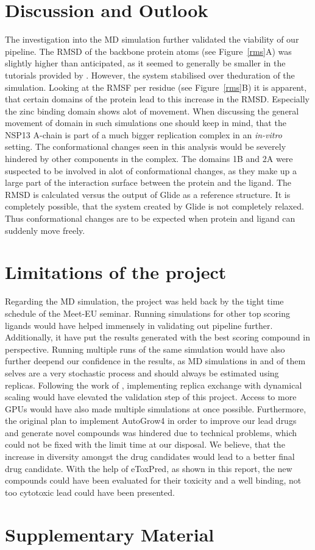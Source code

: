 \documentclass[11pt, letterpaper, titlepage]{article}
\renewcommand{\cite}{\parencite}
\begin{document}
\FloatBarrier

\section{Discussion and Outlook}
The investigation into the \acf{MD} simulation further validated the viability of our pipeline. The RMSD of the backbone protein atoms (see Figure~\ref{rms}A) was slightly higher than anticipated, as it seemed to generally be smaller in the tutorials provided by \citeauthor{Lemkul2018}. However, the system stabilised over theduration of the simulation. Looking at the RMSF per residue (see Figure~\ref{rms}B) it is apparent, that certain domains of the protein lead to this increase in the RMSD. Especially the zinc binding domain shows alot of movement. When discussing the general movement of domain in such simulations one should keep in mind, that the NSP13 A-chain is part of a much bigger replication complex \cite{NSP13_basics} in an \textit{in-vitro} setting. The conformational changes seen in this analysis would be severely hindered by other components in the complex. The domains 1B and 2A were suspected to be involved in alot of conformational changes, as they make up a large part of the interaction surface between the protein and the ligand. The RMSD is calculated versus the output of Glide as a reference structure. It is completely possible, that the system created by Glide is not completely relaxed. Thus conformational changes are to be expected when protein and ligand can suddenly move freely.

\section{Limitations of the project}
Regarding the \acf{MD} simulation, the project was held back by the tight time schedule of the Meet-EU seminar. Running simulations for other top scoring ligands would have helped immensely in validating out pipeline further. Additionally, it have put the results generated with the best scoring compound in perspective. Running multiple runs of the same simulation would have also further deepend our confidence in the results, as MD simulations in and of them selves are a very stochastic process and should always be estimated using replicas. Following the work of \textcite{REDS}, implementing replica exchange with dynamical scaling would have elevated the validation step of this project. Access to more GPUs would have also made multiple simulations at once possible. 
Furthermore, the original plan to implement AutoGrow4 \cite{packageAutogrow4} in order to improve our lead drugs and generate novel compounds was hindered due to technical problems, which could not be fixed with the limit time at our disposal. We believe, that the increase in diversity amongst the drug candidates would lead to a better final drug candidate. With the help of eToxPred, as shown in this report, the new compounds could have been evaluated for their toxicity and a well binding, not too cytotoxic lead could have been presented. 



\section{Supplementary Material}

\pagebreak
\FloatBarrier

\renewcommand{\bibname}{References}  %
\printbibliography
\end{document}
